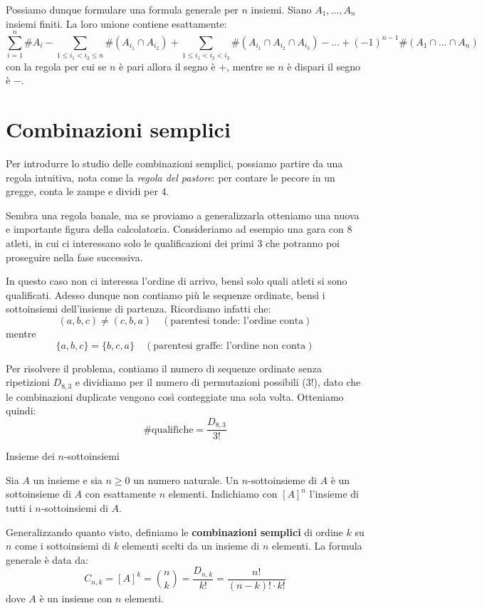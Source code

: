 \documentclass[12pt]{report}
\begin{document}
	Possiamo dunque formulare una formula generale per $n$ insiemi.
	Siano $A_1, \dots, A_n$ insiemi finiti. La loro unione contiene esattamente:
	\[
		\sum_{i=1}^{n} \#A_i - \sum_{1 \le i_1 < i_2 \le n} \#(A_{i_1} \cap A_{i_2}) + \sum_{1 \le i_1 < i_2 < i_3} \#(A_{i_1} \cap A_{i_2} \cap A_{i_3}) - \dots + (-1)^{n-1} \#(A_1 \cap \dots \cap A_n)
	\]
	con la regola per cui se $n$ è pari allora il segno è $+$, mentre se $n$ è dispari il segno è $-$.
	
	\section{Combinazioni semplici}
	
	Per introdurre lo studio delle combinazioni semplici, possiamo partire da una regola intuitiva, nota come la \emph{regola del pastore}: per contare le pecore in un gregge, conta le zampe e dividi per $4$. 
	
	Sembra una regola banale, ma se proviamo a generalizzarla otteniamo una nuova e importante figura della calcolatoria. Consideriamo ad esempio una gara con $8$ atleti, in cui ci interessano solo le qualificazioni dei primi $3$ che potranno poi proseguire nella fase successiva.
	
	In questo caso non ci interessa l'ordine di arrivo, bensì solo quali atleti si sono qualificati. Adesso dunque non contiamo più le sequenze ordinate, bensì i sottoinsiemi dell'insieme di partenza. 
	Ricordiamo infatti che:
	\[
		(a, b, c) \neq (c, b, a) \quad (\text{parentesi tonde: l'ordine conta})
	\]
	mentre
	\[
		\{a, b, c\} = \{b, c, a\} \quad (\text{parentesi graffe: l'ordine non conta})
	\]
	
	Per risolvere il problema, contiamo il numero di sequenze ordinate senza ripetizioni $D_{8,3}$ e dividiamo per il numero di permutazioni possibili ($3!$), dato che le combinazioni duplicate vengono così conteggiate una sola volta. Otteniamo quindi:
	\[
		\text{\# qualifiche} = \frac{D_{8,3}}{3!}
	\]
	
	\begin{definizione}{Insieme dei $n$-sottoinsiemi}{}
		
		Sia $A$ un insieme e sia $n \ge 0$ un numero naturale. Un $n$-sottoinsieme di $A$ è un sottoinsieme di $A$ con esattamente $n$ elementi. Indichiamo con $[A]^n$ l'insieme di tutti i $n$-sottoinsiemi di $A$.
		
	\end{definizione}
	
	Generalizzando quanto visto, definiamo le \textbf{combinazioni semplici} di ordine $k$ su $n$ come i sottoinsiemi di $k$ elementi scelti da un insieme di $n$ elementi. La formula generale è data da:
	\[
		C_{n,k} = [A]^k = \binom{n}{k} = \frac{D_{n,k}}{k!} = \frac{n!}{(n-k)! \cdot k!}
	\]
	dove $A$ è un insieme con $n$ elementi.
	
\end{document}
